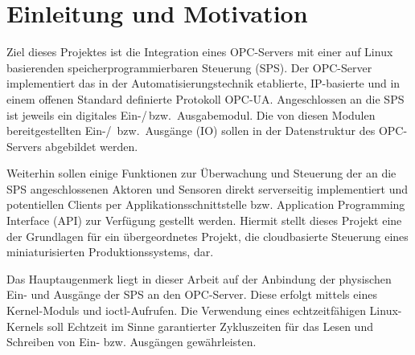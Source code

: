 %
%
%

% 
% 
%
%
%
%
%

\section{Einleitung und Motivation%
  \label{sec:1-einleitung}}
Ziel dieses Projektes ist die Integration eines OPC-Servers mit einer auf Linux
basierenden speicherprogrammierbaren Steuerung (SPS). Der OPC-Server implementiert das
in der Automatisierungstechnik etablierte, IP-basierte und in einem offenen Standard 
definierte Protokoll OPC-UA.
Angeschlossen an die SPS ist jeweils ein digitales Ein-/\,bzw.~Ausgabemodul. 
Die von diesen Modulen bereitgestellten Ein-/\, bzw.~Ausgänge (IO) sollen in 
der Datenstruktur des OPC-Servers abgebildet werden.

Weiterhin sollen einige Funktionen zur Überwachung und Steuerung der an die SPS 
angeschlossenen Aktoren und Sensoren direkt serverseitig implementiert und potentiellen Clients per Applikationsschnittstelle bzw. Application Programming Interface (API) zur Verfügung gestellt werden.
Hiermit stellt dieses Projekt eine der Grundlagen für ein übergeordnetes Projekt,
die cloudbasierte Steuerung eines miniaturisierten Produktionssystems, dar.

Das Hauptaugenmerk liegt in dieser Arbeit auf der Anbindung der physischen Ein- und Ausgänge der SPS an den OPC-Server.
Diese erfolgt mittels eines Kernel-Moduls und ioctl-Aufrufen. Die Verwendung eines echtzeitfähigen Linux-Kernels soll
Echtzeit im Sinne garantierter Zykluszeiten für das Lesen und Schreiben von Ein- bzw. Ausgängen gewährleisten.

